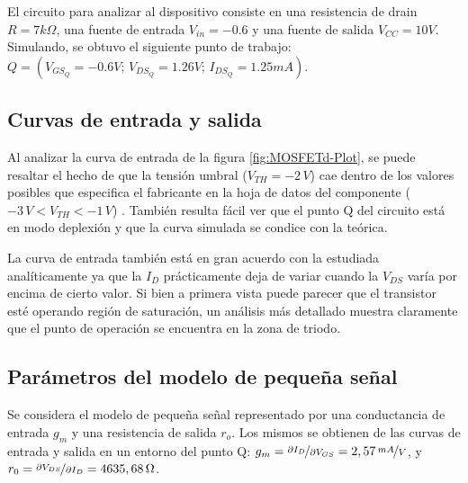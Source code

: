 \documentclass[../main.tex]{subfiles}
\begin{document}
El circuito para analizar al dispositivo consiste en una resistencia de drain $R = 7k\Omega$, una fuente de entrada $V_{in} = -0.6$ y una fuente de salida $V_{CC} = 10V$. Simulando, se obtuvo el siguiente punto de trabajo: $Q = (V_{GS_Q} = -0.6V;\, V_{DS_Q}=1.26V;\, I_{DS_Q}=1.25mA)$.    

    
\subsection{Curvas de entrada y salida}

Al analizar la curva de entrada de la figura \ref{fig:MOSFETd-Plot}, se puede resaltar el hecho de que la tensión umbral ($V_{TH} = -2\,V$) cae dentro de los valores posibles que especifica el fabricante en la hoja de datos del componente ($-3\,V<V_{TH}<-1\,V$) \cite{lnd250}. También resulta fácil ver que el punto Q del circuito está en modo deplexión y que la curva simulada se condice con la teórica.

La curva de entrada también está en gran acuerdo con la estudiada analíticamente ya que la $I_D$ prácticamente deja de variar cuando la $V_{DS}$ varía por encima de cierto valor. Si bien a primera vista puede parecer que el transistor esté operando región de saturación, un análisis más detallado muestra claramente que el punto de operación se encuentra en la zona de triodo.



\subsection{Parámetros del modelo de pequeña señal}
Se considera el modelo de pequeña señal representado por una conductancia de entrada $g_m$ y una resistencia de salida $r_o$. Los mismos se obtienen de las curvas de entrada y salida en un entorno del punto Q: $g_m = \nicefrac{\partial I_D}{\partial V_{GS}} = 2,57\,\nicefrac{mA}{V}$, y $r_0=\nicefrac{\partial V_{DS}}{\partial I_D}=4635,68\,\Omega$.
\end{document}
